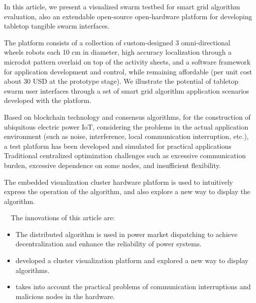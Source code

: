 \begin{eabstract}
  In this article, we present a visualized swarm testbed for smart grid algorithm evaluation, also an extendable open-source open-hardware platform for developing tabletop tangible swarm interfaces.

  The platform consists of a collection of custom-designed 3 omni-directional wheels robots each 10 cm in diameter, high accuracy localization through a microdot pattern overlaid on top of the activity sheets, and a software framework for application development and control, while remaining affordable (per unit cost about 30 USD at the prototype stage). We illustrate the potential of tabletop swarm user interfaces through a set of smart grid algorithm application scenarios developed with the platform.

  Based on blockchain technology and consensus algorithms, for the construction of ubiquitous electric power IoT, considering the problems in the actual application environment (such as noise, interference, local communication interruption, etc.), a test platform has been developed and simulated for practical applications Traditional centralized optimization challenges such as excessive communication burden, excessive dependence on some nodes, and insufficient flexibility.

  The embedded visualization cluster hardware platform is used to intuitively express the operation of the algorithm, and also explore a new way to display the algorithm.
  
  The innovations of this article are:

  \begin{itemize}
    \item The distributed algorithm is used in power market dispatching to achieve decentralization and enhance the reliability of power systems.
    \item developed a cluster visualization platform and explored a new way to display algorithms.
    \item takes into account the practical problems of communication interruptions and malicious nodes in the hardware.
  \end{itemize}


\end{eabstract}

